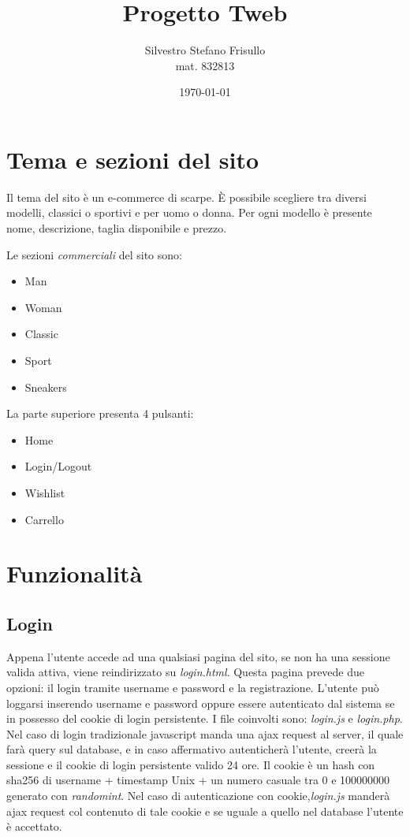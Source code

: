\documentclass[a4paper,12pt]{article}
\begin{document}
\title{Progetto Tweb}
\author{Silvestro Stefano Frisullo \\ mat. 832813}
\date{\today}
\maketitle
{}
\tableofcontents

\newpage
{}

\section{Tema e sezioni del sito}
Il tema del sito è un e-commerce di scarpe.
È possibile scegliere tra diversi modelli, classici o sportivi e per uomo o donna.
Per ogni modello è presente nome, descrizione, taglia disponibile e prezzo.

Le sezioni \textit{commerciali} del sito sono:
\begin{itemize}
	\item Man
	\item Woman
	\item Classic
	\item Sport
	\item Sneakers
\end{itemize}
La parte superiore presenta 4 pulsanti:
\begin{itemize}
	\item Home
	\item Login/Logout
	\item Wishlist
	\item Carrello
\end{itemize}

\section{Funzionalità}
\subsection{Login}
Appena l'utente accede ad una qualsiasi pagina del sito, se non ha una sessione valida attiva,
viene reindirizzato su \textit{login.html}. Questa pagina prevede due opzioni: il login tramite
username e password e la registrazione. L'utente può loggarsi inserendo username e password oppure
essere autenticato dal sistema se in possesso del cookie di login persistente.
I file coinvolti sono: \textit{login.js} e \textit{login.php}. Nel caso di login tradizionale javascript
manda una ajax request al server, il quale farà query sul database, e in caso affermativo
autenticherà l'utente, creerà la sessione e il cookie di login persistente valido 24 ore.
Il cookie è un hash con sha256 di username + timestamp Unix + un numero casuale tra 0 e 100000000
generato con \textit{random\textunderscore int}.
Nel caso di autenticazione con cookie,\textit{login.js} manderà ajax request col contenuto di tale cookie e
se uguale a quello nel database l'utente è accettato.
\end{document}
